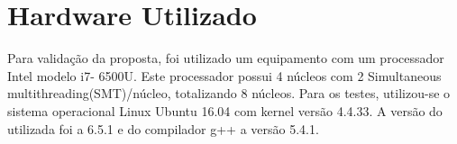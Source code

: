 \section{Hardware Utilizado}
Para validação da proposta, foi utilizado um equipamento com um processador Intel modelo i7-
6500U. Este processador possui 4 núcleos com 2 Simultaneous multithreading(SMT)/núcleo, totalizando 8 núcleos. Para os testes, utilizou-se o sistema operacional Linux Ubuntu 16.04 com kernel versão 4.4.33. A versão do \charm~ utilizada foi a 6.5.1 e do compilador g++ a versão 5.4.1.